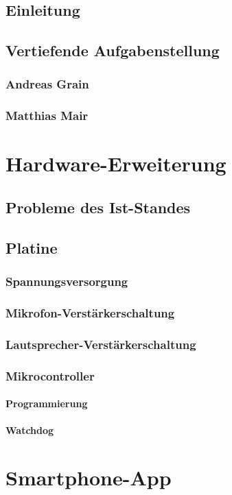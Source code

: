 \documentclass[a4paper, 12pt, twoside, openright
]{memoir}
\begin{document}
\mainmatter
\chapter{Einleitung}
\chapter{Vertiefende Aufgabenstellung}
\section{Andreas Grain}
\section{Matthias Mair}

\part{Hardware-Erweiterung}
\chapter{Probleme des Ist-Standes}
\chapter{Platine}
\section{Spannungsversorgung}
\section{Mikrofon-Verstärkerschaltung}
\section{Lautsprecher-Verstärkerschaltung}
\section{Mikrocontroller}
\subsection{Programmierung}
\subsection{Watchdog}

\part{Smartphone-App}
\end{document}
